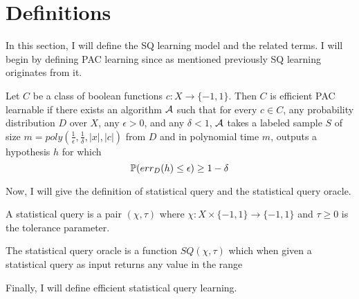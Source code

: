 \section{Definitions}
\label{sec:definitions}
In this section, I will define the SQ learning model and the related terms. I will begin by defining PAC learning since as mentioned previously SQ learning originates from it.

\begin{definition}
Let $C$ be a class of boolean functions $c: X \xrightarrow{} \{-1, 1\}$. Then $C$ is efficient PAC learnable if there exists an algorithm $\mathcal{A}$ such that for every $c \in C$, any probability distribution $D$ over $X$, any $\epsilon > 0$, and any $\delta < 1$, $\mathcal{A}$ takes a labeled sample $S$ of size $m = poly\left(\frac{1}{\epsilon}, \frac{1}{\delta}, |x|, |c|\right)$ from $D$ and in polynomial time $m$, outputs a hypothesis $h$ for which
    \begin{equation*}
        \mathbb{P}( err_D(h) \leq \epsilon ) \geq 1 - \delta
    \end{equation*}
\end{definition}

Now, I will give the definition of statistical query and the statistical query oracle.

\begin{definition}
A statistical query is a pair $(\chi, \tau)$ where $\chi: X \times \{-1, 1\} \xrightarrow{} \{-1, 1\}$ and $\tau \geq 0$ is the tolerance parameter.
\end{definition}

\begin{definition}
The statistical query oracle is a function $SQ(\chi, \tau)$ which when given a statistical query as input returns any value in the range
\begin{equation*}
    [\EE{\chi(x, c(x))} - \tau, \EE{\chi(x, c(x))} + \tau]
\end{equation*}
\end{definition}

Finally, I will define efficient statistical query learning.

